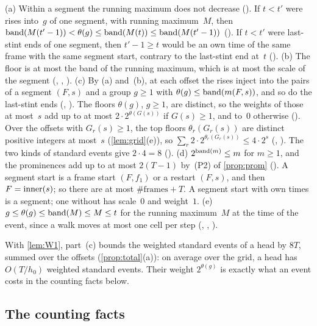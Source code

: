 \begin{outline}
(a) Within a segment the running maximum does not decrease (). If $t<t'$ were rises
into~$g$ of one segment, with running maximum~$M$, then $\operatorname{band}(M(t'-1))<\theta(g)\le\operatorname{band}(M(t))\le\operatorname{band}(M(t'-1))$
(). If $t<t'$ were last-stint ends of one segment, then $t'-1\ge t$ would be an own time of the same
frame with the same segment start, contrary to the last-stint end at~$t$ (). (b) The floor is
at most the band of the running maximum, which is at most the scale of the segment (,
, ). (c) By (a) and~(b), at each offset the rises inject into
the pairs of a segment $(F,s)$ and a group $g\ge1$ with $\theta(g)\le\operatorname{band}(m(F,s))$, and so do the last-stint ends
(, ). The floors $\theta(g)$, $g\ge1$, are distinct, so the
weights of those at most~$s$ add up to at most $2\cdot2^{\theta(G(s))}$ if $G(s)\ge1$, and to~$0$ otherwise
(). Over the offsets with $G_r(s)\ge1$, the top floors $\theta_r(G_r(s))$ are distinct
positive integers at most~$s$ (\cref{lem:grid}(e)), so $\sum_r2\cdot2^{\theta_r(G_r(s))}\le4\cdot2^s$
(, ). The two kinds of standard events give
$2\cdot4=8$ (). (d) $2^{\operatorname{band}(m)}\le m$ for $m\ge1$, and the prominences add up to at most
$2(T-1)$ by~(P2) of \cref{prop:prom} (). A segment start is a frame start $(F,f_1)$ or a restart $(F,s)$,
and then $F=\operatorname{inner}(s)$; so there are at most $\#\text{frames}+T$. A segment start with own times is a segment; one without has
scale~$0$ and weight~$1$. (e) $g\le\theta(g)\le\operatorname{band}(M)\le M\le t$ for the running maximum~$M$ at the time of the event, since a
walk moves at most one cell per step (, , ).
\end{outline}

With \cref{lem:W1}, part~(c) bounds the weighted standard events of a head by $8T$, summed over the offsets
(\cref{prop:total}(a)): on average over the grid, a head has $O(T/h_0)$ weighted standard events. Their weight $2^{\theta(g)}$ is
exactly what an event costs in the counting facts below.

\subsection{The counting facts}\label{sec:acc-counting}

